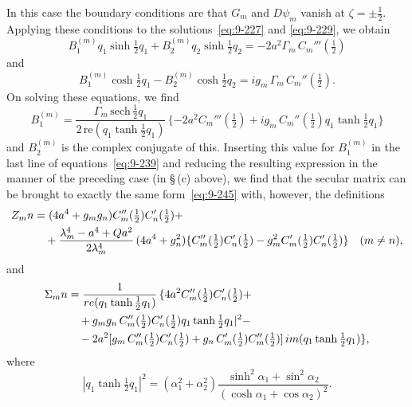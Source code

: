 In this case the boundary conditions are that $G_m$ and $D\psi_m$ vanish at $\zeta = \pm\frac{1}{2}$. Applying these conditions to the solutions~\eqref{eq:9-227} and \eqref{eq:9-229}, we obtain
\begin{equation}
B_1^{(m)} q_1\sinh\tfrac{1}{2}q_1 + B_2^{(m)} q_2\sinh\tfrac{1}{2}q_2 = -2a^2\Gamma_m\, C_m'''(\tfrac{1}{2}) \label{eq:9-252}
\end{equation}
and
\begin{equation}
B_1^{(m)}\cosh\tfrac{1}{2}q_1 - B_2^{(m)}\cosh\tfrac{1}{2}q_2 = ig_m\,\Gamma_m\, C_m''(\tfrac{1}{2}). \label{eq:9-253}
\end{equation}
On solving these equations, we find
\begin{equation}
B_1^{(m)} = \frac{\Gamma_m\,\mathrm{sech}\,\tfrac{1}{2}q_1}{2\,\mathrm{re}(q_1\tanh\tfrac{1}{2}q_1)}\,\{-2a^2 C_m'''(\tfrac{1}{2}) + ig_m\, C_m''(\tfrac{1}{2})q_1\tanh\tfrac{1}{2}q_1\} \label{eq:9-253a}
\end{equation}
and $B_2^{(m)}$ is the complex conjugate of this. Inserting this value for $B_1^{(m)}$ in the last line of equations~\eqref{eq:9-239} and reducing the resulting expression in the manner of the preceding case (in \S\,(c) above), we find that the secular matrix can be brought to exactly the same form~\eqref{eq:9-245} with, however, the definitions
\begin{align}
Z_\mathrm{mn} &= (4a^4 + g_m g_n)C_m''(\tfrac{1}{2})C_n'(\tfrac{1}{2}) + \notag \\
&\quad + \frac{\lambda_m^4 - a^4 + Qa^2}{2\lambda_m^4}\,(4a^4 + g_n^2)\{C_m''(\tfrac{1}{2})C_n'(\tfrac{1}{2}) - g_m^2 C_m'(\tfrac{1}{2})C_n'(\tfrac{1}{2})\} \quad (m \ne n), \label{eq:9-254}
\end{align}
and
\begin{align}
\Sigma_\mathrm{mn} &= \frac{1}{\mathrm{re}(q_1\tanh\tfrac{1}{2}q_1)}\,\{4a^2 C_m''(\tfrac{1}{2})C_n'(\tfrac{1}{2}) + \notag \\
&\quad + g_m g_n\, C_m''(\tfrac{1}{2})C_n'(\tfrac{1}{2})q_1\tanh\tfrac{1}{2}q_1|^2 - \notag \\
&\quad - 2a^2[g_m\, C_m''(\tfrac{1}{2})C_n'(\tfrac{1}{2}) + g_n\, C_m'(\tfrac{1}{2})C_m''(\tfrac{1}{2})]\,\mathrm{im}(q_1\tanh\tfrac{1}{2}q_1)\}, \label{eq:9-255}
\end{align}
where
\begin{equation}
|q_1\tanh\tfrac{1}{2}q_1|^2 = (\alpha_1^2 + \alpha_2^2)\frac{\sinh^2\alpha_1 + \sin^2\alpha_2}{(\cosh\alpha_1 + \cos\alpha_2)^2}. \label{eq:9-256}
\end{equation}

